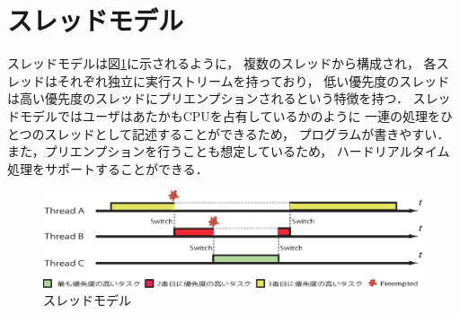 \section{スレッドモデル}
スレッドモデルは図\ref{fig:threads_model}に示されるように，
複数のスレッドから構成され，
各スレッドはそれぞれ独立に実行ストリームを持っており，
低い優先度のスレッドは高い優先度のスレッドにプリエンプションされるという特徴を持つ．
スレッドモデルではユーザはあたかもCPUを占有しているかのように
一連の処理をひとつのスレッドとして記述することができるため，
プログラムが書きやすい．
また，プリエンプションを行うことも想定しているため，
ハードリアルタイム処理をサポートすることができる．
\begin{figure}[htbp]
 \begin{center}
  \includegraphics[width=140mm]{./images/threads_model.eps}
 \end{center}
 \caption{スレッドモデル}
 \label{fig:threads_model}
\end{figure}


